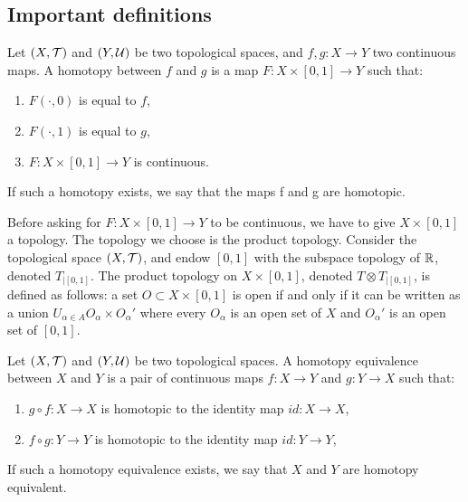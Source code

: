 \subsection{Important definitions}

\begin{definition}
    Let $(X, \mathcal{T})$ and $(Y, \mathcal{U})$ be two topological spaces, and $f, g : X \to Y$
    two continuous maps. A homotopy between $f$ and $g$ is a map $F : X \times
    [0, 1] \to Y$ such that:
    \begin{enumerate}
        \item $F(\cdot, 0)$ is equal to $f$, 
        \item $F(\cdot, 1)$ is equal to $g$, 
        \item $F : X \times [0, 1] \to Y$ is continuous.
    \end{enumerate}
    If such a homotopy exists, we say that the maps f and g are homotopic.
\end{definition}

\begin{remark}
    Before asking for $F : X \times [0, 1] \to Y$ to be continuous, we have to
    give $X \times [0, 1]$ a topology. The topology we choose is the product
    topology. Consider the topological space $(X, \mathcal{T})$, and endow $[0, 1]$
    with the subspace topology of $\mathbb{R}$, denoted $T_{|[0,1]}$. The product
    topology on $X \times [0, 1]$, denoted $T \otimes T_{|[0,1]}$, is defined
    as follows: a set $O \subset X \times [0, 1]$ is open if and only if it
    can be written as a union $U_{\alpha \in A} O_{\alpha} \times O_{\alpha}'$
    where every $O_{\alpha}$ is an open set of $X$ and $O_{\alpha}'$ is an open set of $[0, 1]$.
\end{remark}
 
\begin{definition}
    Let $(X, \mathcal{T})$ and $(Y, \mathcal{U})$ be two topological spaces. A homotopy
    equivalence between $X$ and $Y$ is a pair of continuous maps $f : X \to Y$
    and $g : Y \to X$ such that:
    \begin{enumerate}
        \item $g \circ f : X \to X$ is homotopic to the identity map $id: X \to X$,
        \item $f \circ g : Y \to Y$ is homotopic to the identity map $id: Y \to Y$,
    \end{enumerate}
    If such a homotopy equivalence exists, we say that $X$ and $Y$ are homotopy equivalent.   
\end{definition}

